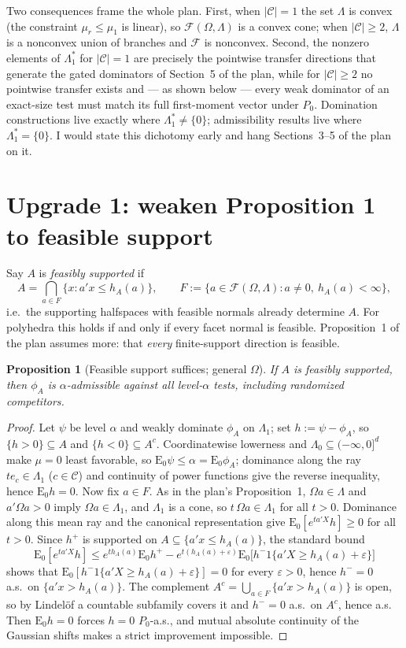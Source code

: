 \documentclass[12pt]{article}
\newtheorem{proposition}{Proposition}
\theoremstyle{remark}
\newcommand{\E}{\mathrm{E}}
\newcommand{\cC}{\mathcal C}
\newcommand{\cF}{\mathcal F}
\begin{document}
Two consequences frame the whole plan. First, when $|\cC|=1$ the set
$\Lambda$ is convex (the constraint $\mu_r\le\mu_1$ is linear), so
$\cF(\Omega,\Lambda)$ is a convex cone; when $|\cC|\ge2$, $\Lambda$ is a
nonconvex union of branches and $\cF$ is nonconvex. Second, the nonzero
elements of $\Lambda_1^*$ for $|\cC|=1$ are precisely the pointwise
transfer directions that generate the gated dominators of Section~5 of the
plan, while for $|\cC|\ge2$ no pointwise transfer exists and --- as shown
below --- every weak dominator of an exact-size test must match its full
first-moment vector under $P_0$. Domination constructions live exactly
where $\Lambda_1^*\ne\{0\}$; admissibility results live where
$\Lambda_1^*=\{0\}$. I would state this dichotomy early and hang
Sections~3--5 of the plan on it.

\section{Upgrade 1: weaken Proposition 1 to feasible support}

Say $A$ is \emph{feasibly supported} if
\[
A=\bigcap_{a\in F}\{x:a'x\le h_A(a)\},
\qquad
F:=\{a\in\cF(\Omega,\Lambda):a\ne0,\ h_A(a)<\infty\},
\]
i.e.\ the supporting halfspaces with feasible normals already determine $A$.
For polyhedra this holds if and only if every facet normal is feasible.
Proposition~1 of the plan assumes more: that \emph{every} finite-support
direction is feasible.

\begin{proposition}[Feasible support suffices; general $\Omega$]
\label{prop:A}
If $A$ is feasibly supported, then $\phi_A$ is $\alpha$-admissible against
all level-$\alpha$ tests, including randomized competitors.
\end{proposition}

\begin{proof}
Let $\psi$ be level $\alpha$ and weakly dominate $\phi_A$ on $\Lambda_1$;
set $h:=\psi-\phi_A$, so $\{h>0\}\subseteq A$ and $\{h<0\}\subseteq A^c$.
Coordinatewise lowerness and $\Lambda_0\subseteq(-\infty,0]^d$ make $\mu=0$
least favorable, so $\E_0\psi\le\alpha=\E_0\phi_A$; dominance along the ray
$te_c\in\Lambda_1$ ($c\in\cC$) and continuity of power functions give the
reverse inequality, hence $\E_0h=0$. Now fix $a\in F$. As in the plan's
Proposition~1, $\Omega a\in\Lambda$ and $a'\Omega a>0$ imply
$\Omega a\in\Lambda_1$, and $\Lambda_1$ is a cone, so
$t\,\Omega a\in\Lambda_1$ for all $t>0$. Dominance along this mean ray and
the canonical representation give
$\E_0[e^{ta'X}h]\ge0$ for all $t>0$. Since $h^+$ is supported on
$A\subseteq\{a'x\le h_A(a)\}$, the standard bound
\[
\E_0[e^{ta'X}h]
\le
e^{th_A(a)}\E_0h^+
-e^{t(h_A(a)+\varepsilon)}
\E_0\bigl[h^-1\{a'X\ge h_A(a)+\varepsilon\}\bigr]
\]
shows that $\E_0[h^-1\{a'X\ge h_A(a)+\varepsilon\}]=0$ for every
$\varepsilon>0$, hence $h^-=0$ a.s.\ on $\{a'x>h_A(a)\}$. The complement
$A^c=\bigcup_{a\in F}\{a'x>h_A(a)\}$ is open, so by Lindel\"of a countable
subfamily covers it and $h^-=0$ a.s.\ on $A^c$, hence a.s. Then $\E_0h=0$
forces $h=0$ $P_0$-a.s., and mutual absolute continuity of the Gaussian
shifts makes a strict improvement impossible.
\end{proof}
\end{document}
